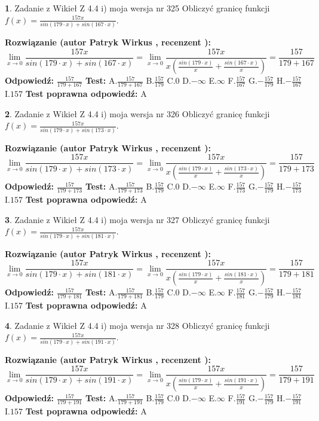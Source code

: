 \documentclass[12pt, a4paper]{article}
\theoremstyle{definition} %
\newtheorem{zad}{}
\newcommand{\zadStart}[1]{\begin{zad}#1\newline}
\newcommand{\zadStop}{\end{zad}}
\newcommand{\rozwStart}[2]{\noindent \textbf{Rozwiązanie (autor #1 , recenzent #2): }\newline}
\newcommand{\rozwStop}{\newline}
\newcommand{\odpStart}{\noindent \textbf{Odpowiedź:}\newline}
\newcommand{\odpStop}{\newline}
\newcommand{\testStart}{\noindent \textbf{Test:}\newline}
\newcommand{\testStop}{\newline}
\newcommand{\kluczStart}{\noindent \textbf{Test poprawna odpowiedź:}\newline}
\newcommand{\kluczStop}{\newline}
\begin{document}
\zadStart{Zadanie z Wikieł Z 4.4 i) moja wersja nr 325}
Obliczyć granicę funkcji $f(x)=\frac{157x}{sin(179\cdot x) +sin(167\cdot x)}$.
\zadStop
\rozwStart{Patryk Wirkus}{}
$$\lim\limits_{x\to 0}\frac{157x}{sin(179\cdot x) +sin(167\cdot x)}=\lim\limits_{x\to 0}\frac{157x}{x(\frac{sin(179\cdot x)}{x}+\frac{sin(167\cdot x)}{x})}=\frac{157}{179+167}$$
\rozwStop
\odpStart
$\frac{157}{179+167}$
\odpStop
\testStart
A.$\frac{157}{179+167}$
B.$\frac{157}{179}$
C.$0$
D.$-\infty$
E.$\infty$
F.$\frac{157}{167}$
G.$-\frac{157}{179}$
H.$-\frac{157}{167}$
I.$157$
\testStop
\kluczStart
A
\kluczStop



\zadStart{Zadanie z Wikieł Z 4.4 i) moja wersja nr 326}
Obliczyć granicę funkcji $f(x)=\frac{157x}{sin(179\cdot x) +sin(173\cdot x)}$.
\zadStop
\rozwStart{Patryk Wirkus}{}
$$\lim\limits_{x\to 0}\frac{157x}{sin(179\cdot x) +sin(173\cdot x)}=\lim\limits_{x\to 0}\frac{157x}{x(\frac{sin(179\cdot x)}{x}+\frac{sin(173\cdot x)}{x})}=\frac{157}{179+173}$$
\rozwStop
\odpStart
$\frac{157}{179+173}$
\odpStop
\testStart
A.$\frac{157}{179+173}$
B.$\frac{157}{179}$
C.$0$
D.$-\infty$
E.$\infty$
F.$\frac{157}{173}$
G.$-\frac{157}{179}$
H.$-\frac{157}{173}$
I.$157$
\testStop
\kluczStart
A
\kluczStop



\zadStart{Zadanie z Wikieł Z 4.4 i) moja wersja nr 327}
Obliczyć granicę funkcji $f(x)=\frac{157x}{sin(179\cdot x) +sin(181\cdot x)}$.
\zadStop
\rozwStart{Patryk Wirkus}{}
$$\lim\limits_{x\to 0}\frac{157x}{sin(179\cdot x) +sin(181\cdot x)}=\lim\limits_{x\to 0}\frac{157x}{x(\frac{sin(179\cdot x)}{x}+\frac{sin(181\cdot x)}{x})}=\frac{157}{179+181}$$
\rozwStop
\odpStart
$\frac{157}{179+181}$
\odpStop
\testStart
A.$\frac{157}{179+181}$
B.$\frac{157}{179}$
C.$0$
D.$-\infty$
E.$\infty$
F.$\frac{157}{181}$
G.$-\frac{157}{179}$
H.$-\frac{157}{181}$
I.$157$
\testStop
\kluczStart
A
\kluczStop



\zadStart{Zadanie z Wikieł Z 4.4 i) moja wersja nr 328}
Obliczyć granicę funkcji $f(x)=\frac{157x}{sin(179\cdot x) +sin(191\cdot x)}$.
\zadStop
\rozwStart{Patryk Wirkus}{}
$$\lim\limits_{x\to 0}\frac{157x}{sin(179\cdot x) +sin(191\cdot x)}=\lim\limits_{x\to 0}\frac{157x}{x(\frac{sin(179\cdot x)}{x}+\frac{sin(191\cdot x)}{x})}=\frac{157}{179+191}$$
\rozwStop
\odpStart
$\frac{157}{179+191}$
\odpStop
\testStart
A.$\frac{157}{179+191}$
B.$\frac{157}{179}$
C.$0$
D.$-\infty$
E.$\infty$
F.$\frac{157}{191}$
G.$-\frac{157}{179}$
H.$-\frac{157}{191}$
I.$157$
\testStop
\kluczStart
A
\kluczStop
\end{document}
